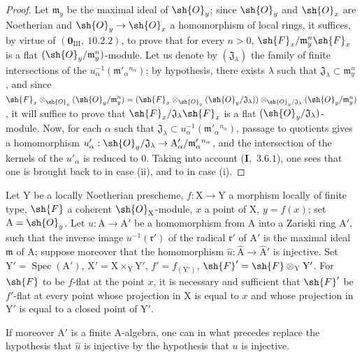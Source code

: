 \begin{proof}
Let $\mathfrak{m}_y$ be the maximal ideal of $\sh{O}_y$; since $\sh{O}_y$ and $\sh{O}_x$ are Noetherian and $\sh{O}_y\to\sh{O}_x$ a
homomorphism of local rings, it suffices, by virtue of $(\mathbf{0}_{\mathrm{III}},~10.2.2)$, to prove that for
every $n>0$, $\sh{F}_x/\mathfrak{m}_y^n\sh{F}_x$ is a flat $(\sh{O}_y/\mathfrak{m}_y^n)$-module. Let us denote by $(\mathfrak{J}_\lambda)$ the family of
finite intersections of the $u_\alpha^{-1}(\mathfrak{m}'_\alpha{}^{n_\alpha})$; by hypothesis, there exists $\lambda$ such that
$\mathfrak{J}_\lambda\subset\mathfrak{m}_y^n$, and since
$\sh{F}_x\otimes_{\sh{O}_y}(\sh{O}_y/\mathfrak{m}_y^n)=(\sh{F}_x\otimes_{\sh{O}_y}(\sh{O}_y/\mathfrak{J}_\lambda))\otimes_{\sh{O}_y/\mathfrak{J}_\lambda}(\sh{O}_y/\mathfrak{m}_y^n)$, it will suffice to prove that $\sh{F}_x/\mathfrak{J}_\lambda\sh{F}_x$ is
a flat $(\sh{O}_y/\mathfrak{J}_\lambda)$-module. Now, for each $\alpha$ such that
$\mathfrak{J}_\lambda\subset u_\alpha^{-1}(\mathfrak{m}'_\alpha{}^{n_\alpha})$, passage to quotients gives
a homomorphism $u'_\alpha:\sh{O}_y/\mathfrak{J}_\lambda\to\mathrm{A}'_\alpha/\mathfrak{m}'_\alpha{}^{n_\alpha}$, and the intersection of the kernels
of the $u'_\alpha$ is reduced to $0$. Taking into account (\textbf{I},~$3.6.1$), one sees that one is brought back to 
in case (ii), and to  in case (i).
\end{proof}

\begin{corollary}[11.5.2]
\label{IV.11.5.2}
Let $\mathrm{Y}$ be a locally Noetherian prescheme, $f:\mathrm{X}\to\mathrm{Y}$ a
morphism locally of finite type, $\sh{F}$ a coherent $\sh{O}_\mathrm{X}$-module, $x$ a point of $\mathrm{X}$, $y=f(x)$; set
$\mathrm{A}=\sh{O}_y$. Let $u:\mathrm{A}\to\mathrm{A}'$ be a homomorphism from $\mathrm{A}$ into a Zariski ring $\mathrm{A}'$, such that
the inverse image $u^{-1}(\mathfrak{r}')$ of the radical $\mathfrak{r}'$ of $\mathrm{A}'$ is the maximal ideal $\mathfrak{m}$ of $\mathrm{A}$; suppose moreover
that the homomorphism $\hat{u}:\hat{\mathrm{A}}\to\hat{\mathrm{A}}'$ is injective. Set $\mathrm{Y}'=\operatorname{Spec}(\mathrm{A}')$, $\mathrm{X}'=\mathrm{X}\times_\mathrm{Y}\mathrm{Y}'$, $f'=f_{(\mathrm{Y}')}$,
$\sh{F}'=\sh{F}\otimes_\mathrm{Y}\mathrm{Y}'$. For $\sh{F}$ to be $f$-flat at the point $x$, it is necessary and sufficient that $\sh{F}'$ be $f'$-flat at every
point whose projection in $\mathrm{X}$ is equal to $x$ and whose projection in $\mathrm{Y}'$ is equal to a closed point
of $\mathrm{Y}'$.

If moreover $\mathrm{A}'$ is a finite $\mathrm{A}$-algebra, one can in what precedes replace the hypothesis that $\hat{u}$
is injective by the hypothesis that $u$ is injective.
\end{corollary}

